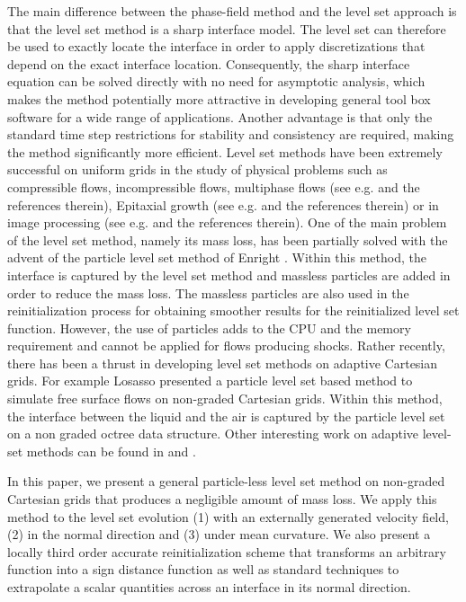 \documentclass[english]{article}
\begin{document}
The main difference between the phase-field method and the level set approach
\cite{osher:1988:originallevelset, sethian:1999:levelset, osher:2002:levelset} is that the level
set method is a sharp interface model. The level set can therefore be used to exactly locate the
interface in order to apply discretizations that depend on the exact interface location.
Consequently, the sharp interface equation can be solved directly with no need for asymptotic
analysis, which makes the method potentially more attractive in developing general tool box
software for a wide range of applications. Another advantage is that only the standard time step
restrictions for stability and consistency are required, making the method significantly more
efficient. Level set methods have been extremely successful on uniform grids in the study of
physical problems such as compressible flows, incompressible flows, multiphase flows (see e.g.
\cite{osher:2002:levelset, sethian:1999:levelset} and the references therein), Epitaxial growth
(see e.g.\cite{Caflisch:1999:Island_Dynamics, Gibou:2001:Rate_Equations_Scaling_Laws,
Gibou:2001:Rate_Equations, Ratsch:2001:Island_Dynamics_Review} and the references therein) or in
image processing (see e.g. \cite{osher:2003:levelset} and the references therein). One of the main
problem of the level set method, namely its mass loss, has been partially solved with the advent of
the particle level set method of Enright \etal \cite{Enright:2002:PLS}. Within this method, the
interface is captured by the level set method and massless particles are added in order to reduce
the mass loss. The massless particles are also used in the reinitialization process for obtaining
smoother results for the reinitialized level set function. However, the use of particles adds to
the CPU and the memory requirement and cannot be applied for flows producing shocks. Rather
recently, there has been a thrust in developing level set methods on adaptive Cartesian grids. For
example Losasso \etal \cite{losasso:2004:octree} presented a particle level set based method to
simulate free surface flows on non-graded Cartesian grids. Within this method, the interface
between the liquid and the air is captured by the particle level set on a non graded octree data
structure. Other interesting work on adaptive level-set methods can be found in
\cite{droske01adaptive} and \cite{Milne:1995:thesis}.

In this paper, we present a general particle-less level set method on
non-graded Cartesian grids that produces a negligible amount of mass loss.
We apply this method to the level set evolution (1) with an externally
generated velocity field, (2) in the normal direction and (3) under mean
curvature. We also present a locally third order accurate reinitialization
scheme that transforms an arbitrary function into a sign distance function
as well as standard techniques to extrapolate a scalar quantities across an
interface in its normal direction.
\end{document}
